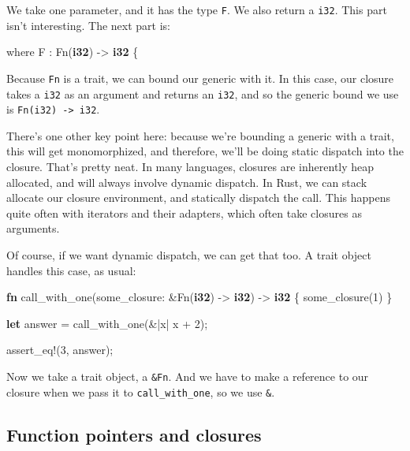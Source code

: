 \documentclass[a4paper,]{book}
\newenvironment{Shaded}{\begin{snugshade}}{\end{snugshade}}
\newcommand{\KeywordTok}[1]{\textcolor[rgb]{0.13,0.29,0.53}{\textbf{{#1}}}}
\newcommand{\DecValTok}[1]{\textcolor[rgb]{0.00,0.00,0.81}{{#1}}}
\newcommand{\OtherTok}[1]{\textcolor[rgb]{0.56,0.35,0.01}{{#1}}}
\newcommand{\NormalTok}[1]{{#1}}
\begin{document}
We take one parameter, and it has the type \texttt{F}. We also return a
\texttt{i32}. This part isn't interesting. The next part is:

\begin{Shaded}
\begin{Highlighting}[]
    \NormalTok{where F : Fn(}\KeywordTok{i32}\NormalTok{) -> }\KeywordTok{i32} \NormalTok{\{}
\end{Highlighting}
\end{Shaded}

Because \texttt{Fn} is a trait, we can bound our generic with it. In
this case, our closure takes a \texttt{i32} as an argument and returns
an \texttt{i32}, and so the generic bound we use is
\texttt{Fn(i32)\ -\textgreater{}\ i32}.

There's one other key point here: because we're bounding a generic with
a trait, this will get monomorphized, and therefore, we'll be doing
static dispatch into the closure. That's pretty neat. In many languages,
closures are inherently heap allocated, and will always involve dynamic
dispatch. In Rust, we can stack allocate our closure environment, and
statically dispatch the call. This happens quite often with iterators
and their adapters, which often take closures as arguments.

Of course, if we want dynamic dispatch, we can get that too. A trait
object handles this case, as usual:

\begin{Shaded}
\begin{Highlighting}[]
\KeywordTok{fn} \NormalTok{call_with_one(some_closure: &Fn(}\KeywordTok{i32}\NormalTok{) -> }\KeywordTok{i32}\NormalTok{) -> }\KeywordTok{i32} \NormalTok{\{}
    \NormalTok{some_closure(}\DecValTok{1}\NormalTok{)}
\NormalTok{\}}

\KeywordTok{let} \NormalTok{answer = call_with_one(&|x| x + }\DecValTok{2}\NormalTok{);}

\OtherTok{assert_eq!}\NormalTok{(}\DecValTok{3}\NormalTok{, answer);}
\end{Highlighting}
\end{Shaded}

Now we take a trait object, a \texttt{\&Fn}. And we have to make a
reference to our closure when we pass it to \texttt{call\_with\_one}, so
we use \texttt{\&\textbar{}\textbar{}}.

\subsection{Function pointers and
closures}\label{function-pointers-and-closures}
\end{document}
